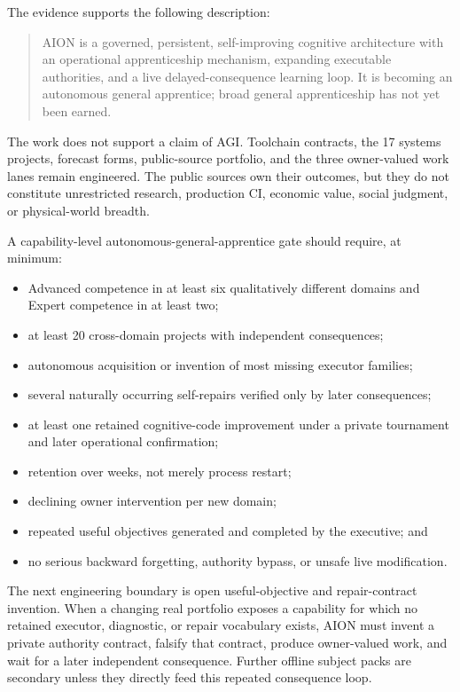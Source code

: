 The evidence supports the following description:
\begin{quote}
AION is a governed, persistent, self-improving cognitive architecture with an
operational apprenticeship mechanism, expanding executable authorities, and a
live delayed-consequence learning loop.  It is becoming an autonomous general
apprentice; broad general apprenticeship has not yet been earned.
\end{quote}

The work does not support a claim of AGI.  Toolchain contracts, the 17 systems
projects, forecast forms, public-source portfolio, and the three owner-valued
work lanes remain engineered.  The public sources own their outcomes, but they
do not constitute unrestricted research, production CI, economic value, social
judgment, or physical-world breadth.

A capability-level autonomous-general-apprentice gate should require, at
minimum:
\begin{itemize}
    \item Advanced competence in at least six qualitatively different domains
          and Expert competence in at least two;
    \item at least 20 cross-domain projects with independent consequences;
    \item autonomous acquisition or invention of most missing executor families;
    \item several naturally occurring self-repairs verified only by later
          consequences;
    \item at least one retained cognitive-code improvement under a private
          tournament and later operational confirmation;
    \item retention over weeks, not merely process restart;
    \item declining owner intervention per new domain;
    \item repeated useful objectives generated and completed by the executive;
          and
    \item no serious backward forgetting, authority bypass, or unsafe live
          modification.
\end{itemize}

The next engineering boundary is open useful-objective and repair-contract
invention.  When a changing real portfolio exposes a capability for which no
retained executor, diagnostic, or repair vocabulary exists, AION must invent a
private authority contract, falsify that contract, produce owner-valued work,
and wait for a later independent consequence.  Further offline subject packs
are secondary unless they directly feed this repeated consequence loop.

